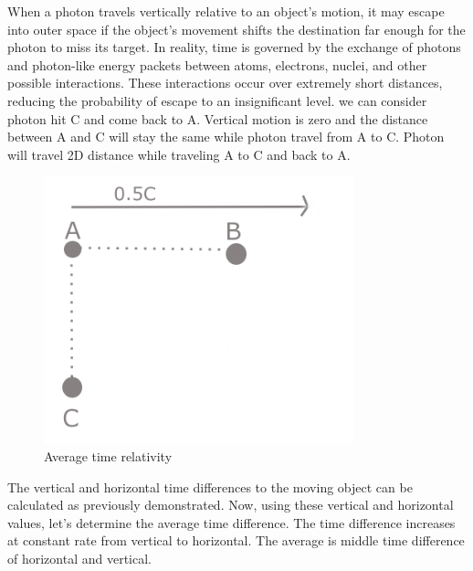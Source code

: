 \documentclass{article}
\begin{document}
    When a photon travels vertically relative to an object’s motion, it may escape into outer space if the object’s movement shifts the destination far enough for the photon to miss its target.
    In reality, time is governed by the exchange of photons and photon-like energy packets between atoms, electrons, nuclei, and other possible interactions.
    These interactions occur over extremely short distances, reducing the probability of escape to an insignificant level.
    we can consider photon hit C and come back to A. Vertical motion is zero and the distance between A and C will stay the same while photon travel from A to C. Photon will travel 2D distance while traveling A to C and back to A\@.


    \begin{figure}[H]
        \centering
        \includegraphics[width=0.8\textwidth]{images/avarage-time-relativity}
        \caption{Average time relativity}
        \label{fig:avarage time relativity}
    \end{figure}

    The vertical and horizontal time differences to the moving object can be calculated as previously demonstrated.
    Now, using these vertical and horizontal values, let’s determine the average time difference.
    The time difference increases at constant rate from vertical to horizontal.
    The average is middle time difference of horizontal and vertical.
\end{document}
